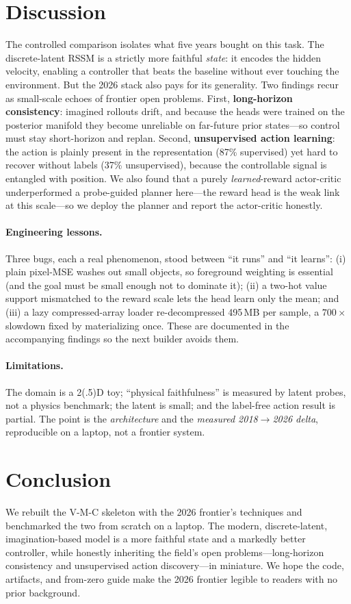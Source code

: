 \documentclass[11pt]{article}
\begin{document}
\section{Discussion}
The controlled comparison isolates what five years bought on this task. The
discrete-latent RSSM is a strictly more faithful \emph{state}: it encodes the hidden
velocity, enabling a controller that beats the baseline without ever touching the
environment. But the 2026 stack also pays for its generality. Two findings recur as
small-scale echoes of frontier open problems. First, \textbf{long-horizon
consistency}: imagined rollouts drift, and because the heads were trained on the
posterior manifold they become unreliable on far-future prior states---so control
must stay short-horizon and replan. Second, \textbf{unsupervised action learning}:
the action is plainly present in the representation (87\% supervised) yet hard to
recover without labels (37\% unsupervised), because the controllable signal is
entangled with position. We also found that a purely \emph{learned}-reward
actor-critic underperformed a probe-guided planner here---the reward head is the weak
link at this scale---so we deploy the planner and report the actor-critic honestly.

\paragraph{Engineering lessons.} Three bugs, each a real phenomenon, stood between
``it runs'' and ``it learns'': (i) plain pixel-MSE washes out small objects, so
foreground weighting is essential (and the goal must be small enough not to dominate
it); (ii) a two-hot value support mismatched to the reward scale lets the head learn
only the mean; and (iii) a lazy compressed-array loader re-decompressed 495\,MB per
sample, a $700\times$ slowdown fixed by materializing once. These are documented in
the accompanying findings so the next builder avoids them.

\paragraph{Limitations.} The domain is a 2(.5)D toy; ``physical faithfulness'' is
measured by latent probes, not a physics benchmark; the latent is small; and the
label-free action result is partial. The point is the \emph{architecture} and the
\emph{measured 2018$\to$2026 delta}, reproducible on a laptop, not a frontier system.

\section{Conclusion}
We rebuilt the V-M-C skeleton with the 2026 frontier's techniques and benchmarked
the two from scratch on a laptop. The modern, discrete-latent, imagination-based
model is a more faithful state and a markedly better controller, while honestly
inheriting the field's open problems---long-horizon consistency and unsupervised
action discovery---in miniature. We hope the code, artifacts, and from-zero guide
make the 2026 frontier legible to readers with no prior background.
\end{document}
